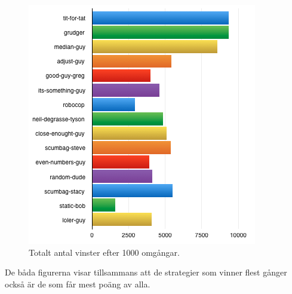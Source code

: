 \begin{figure}[htb]
	\begin{center}
	\includegraphics[scale=0.75, angle=0]{bilder/wins.png}
	\caption{Totalt antal vinster efter 1000 omgångar.}
	\label{wins}
	\end{center}
\end{figure}

De båda figurerna visar tillsammans att de strategier som vinner flest gånger också är de som får mest poäng av alla. 